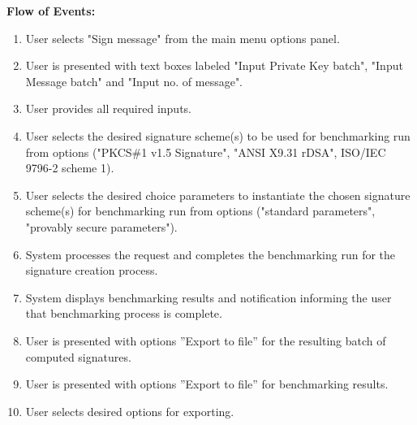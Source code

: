 \documentclass[]{final_report}
\theoremstyle{definition}
\begin{document}
\noindent\textbf{Flow of Events:}
\begin{enumerate}
    \item User selects "Sign message" from the main menu options panel.
    \item User is presented with text boxes labeled "Input Private Key batch", "Input Message batch" and "Input no. of message".
    \item User provides all required inputs.
    \item User selects the desired signature scheme(s) to be used for benchmarking run from options ("PKCS\#1 v1.5 Signature", "ANSI X9.31 rDSA", ISO\slash IEC 9796-2 scheme 1).
        \item User selects the desired choice parameters to instantiate the chosen signature scheme(s) for benchmarking run from options ("standard parameters", "provably secure parameters").
  \item System processes the request and completes the benchmarking run for the signature creation process.
      \item System displays benchmarking results and notification informing the user that benchmarking process is complete.
      \item User is presented with options ”Export to file” for the resulting batch of computed signatures.
       \item User is presented with options ”Export to file” for benchmarking results.
       \item User selects desired options for exporting.
\end{enumerate}
\end{document}
